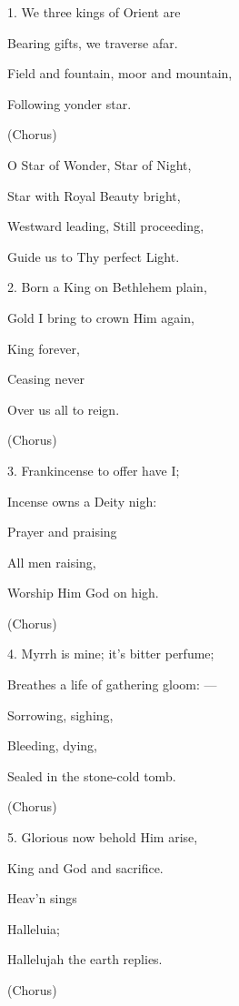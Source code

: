 \begin{description}[nosep,leftmargin=\parindent,labelsep=0pt]
\item 1. We three kings of Orient are 
\item Bearing gifts, we traverse afar. 
\item Field and fountain, moor and mountain, 
\item Following yonder star. 
\vspace{1.5ex}
\item (Chorus) 
\item O Star of Wonder, Star of Night, 
\item Star with Royal Beauty bright, 
\item Westward leading, Still proceeding, 
\item Guide us to Thy perfect Light. 
\vspace{1.5ex}
\item 2. Born a King on Bethlehem plain, 
\item Gold I bring to crown Him again, 
\item King forever, 
\item Ceasing never 
\item Over us all to reign. 
\item (Chorus) 
\vspace{1.5ex}
\item 3. Frankincense to offer have I; 
\item Incense owns a Deity nigh: 
\item Prayer and praising 
\item All men raising, 
\item Worship Him God on high. 
\item (Chorus) 
\vspace{1.5ex}
\item 4. Myrrh is mine; it’s bitter perfume; 
\item Breathes a life of gathering gloom: — 
\item Sorrowing, sighing, 
\item Bleeding, dying, 
\item Sealed in the stone-cold tomb. 
\item (Chorus) 
\vspace{1.5ex}
\item 5. Glorious now behold Him arise, 
\item King and God and sacrifice. 
\item Heav'n sings 
\item Halleluia; 
\item Hallelujah the earth replies. 
\item (Chorus) 
\end{description}
